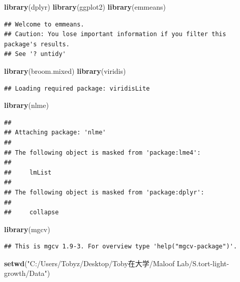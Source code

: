 \documentclass[
]{article}
\newenvironment{Shaded}{\begin{snugshade}}{\end{snugshade}}
\newcommand{\FunctionTok}[1]{\textcolor[rgb]{0.13,0.29,0.53}{\textbf{#1}}}
\newcommand{\NormalTok}[1]{#1}
\newcommand{\StringTok}[1]{\textcolor[rgb]{0.31,0.60,0.02}{#1}}
\begin{document}
\begin{Shaded}
\begin{Highlighting}[]
\FunctionTok{library}\NormalTok{(dplyr)}
\FunctionTok{library}\NormalTok{(ggplot2)}
\FunctionTok{library}\NormalTok{(emmeans)      }
\end{Highlighting}
\end{Shaded}

\begin{verbatim}
## Welcome to emmeans.
## Caution: You lose important information if you filter this package's results.
## See '? untidy'
\end{verbatim}

\begin{Shaded}
\begin{Highlighting}[]
\FunctionTok{library}\NormalTok{(broom.mixed)  }
\FunctionTok{library}\NormalTok{(viridis)      }
\end{Highlighting}
\end{Shaded}

\begin{verbatim}
## Loading required package: viridisLite
\end{verbatim}

\begin{Shaded}
\begin{Highlighting}[]
\FunctionTok{library}\NormalTok{(nlme)         }
\end{Highlighting}
\end{Shaded}

\begin{verbatim}
## 
## Attaching package: 'nlme'
## 
## The following object is masked from 'package:lme4':
## 
##     lmList
## 
## The following object is masked from 'package:dplyr':
## 
##     collapse
\end{verbatim}

\begin{Shaded}
\begin{Highlighting}[]
\FunctionTok{library}\NormalTok{(mgcv)         }
\end{Highlighting}
\end{Shaded}

\begin{verbatim}
## This is mgcv 1.9-3. For overview type 'help("mgcv-package")'.
\end{verbatim}

\begin{Shaded}
\begin{Highlighting}[]
\FunctionTok{setwd}\NormalTok{(}\StringTok{"C:/Users/Tobyz/Desktop/Toby在大学/Maloof Lab/S.tort{-}light{-}growth/Data"}\NormalTok{)}
\end{Highlighting}
\end{Shaded}
\end{document}
